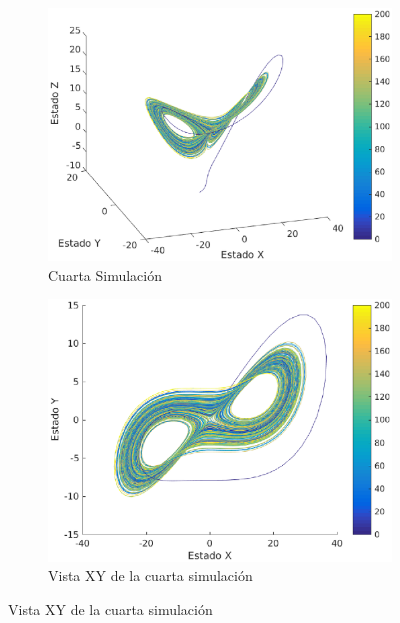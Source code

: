 \documentclass[12pt,letterpaper]{article}
\begin{document}

\begin{figure}
	\centering
	\begin{subfigure}[t]{0.36\textwidth}
		\includegraphics[width=\textwidth]{pictures/cuarta_simulacion}
		\caption{Cuarta Simulación}
		\label{fig:simulacion4}
	\end{subfigure}
	\begin{subfigure}[t]{0.36\textwidth}
		\includegraphics[width=\textwidth]{pictures/cuarta_simulacion_xy}
		\caption{Vista XY de la cuarta simulación}
		\label{fig:simulacion4xy}

\end{subfigure}
\end{figure}
\end{document}
